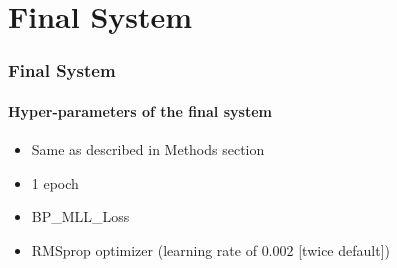 \newcommand{\fisys}{Final System}
\section{\fisys}

\begin{frame}
	\frametitle{\fisys}
	\framesubtitle{Hyper-parameters of the final system}
	\begin{itemize}
		\item Same as described in Methods section
		\item 1 epoch
		\item BP\_MLL\_Loss
		\item RMSprop optimizer
			(learning rate of $0.002$ [twice default])
	\end{itemize}
\end{frame}
